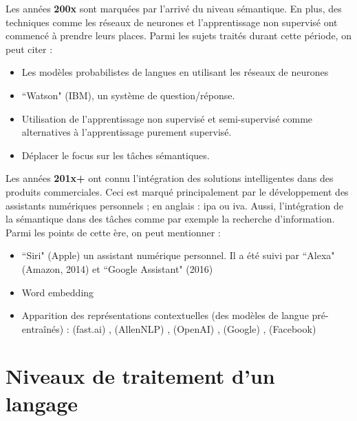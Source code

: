 \documentclass{KodeBook}
\begin{document}
Les années \textbf{200x} sont marquées par l'arrivé du niveau sémantique. 
En plus, des techniques comme les réseaux de neurones et l'apprentissage non supervisé ont commencé à prendre leurs places.
Parmi les sujets traités durant cette période, on peut citer :
\begin{itemize}
	\item {} Les modèles probabilistes de langues en utilisant les réseaux de neurones \cite{2003-bengio-al}
	\item {} ``Watson" (IBM), un système de question/réponse.
	\item Utilisation de l'apprentissage non supervisé et semi-supervisé comme alternatives à l'apprentissage purement supervisé.
	\item Déplacer le focus sur les tâches sémantiques.
\end{itemize}

Les années \textbf{201x+} ont connu l'intégration des solutions intelligentes dans des produits commerciales.
Ceci est marqué principalement par le développement des assistants numériques personnels ; en anglais : \ac{ipa} ou \ac{iva}.
Aussi, l'intégration de la sémantique dans des tâches comme par exemple la recherche d'information. 
Parmi les points de cette ère, on peut mentionner :
\begin{itemize}
	\item {} ``Siri" (Apple)  un assistant numérique personnel. Il a été suivi par ``Alexa" (Amazon, 2014) et ``Google Assistant" (2016)
	\item {} Word embedding \cite{2014-lebret-collobert}
	\item {} Apparition des représentations contextuelles (des modèles de langue pré-entraînés) :  (fast.ai) \cite{2018-howard-ruder},  (AllenNLP) \cite{2018-peters-al},  (OpenAI) \cite{2018-radford-al},  (Google) \cite{2018-devlin-al},  (Facebook) \cite{2019-lample-conneau}
\end{itemize}

\section{Niveaux de traitement d'un langage}
\end{document}
